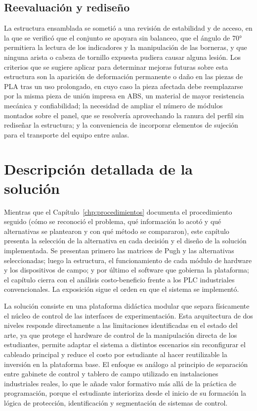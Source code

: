 \documentclass[12pt,a4paper,oneside]{report}
\begin{document}
\section{Reevaluación y rediseño}

La estructura ensamblada se sometió a una revisión de estabilidad y de acceso, en la que se verificó que el conjunto se apoyara sin balanceo, que el ángulo de 70° permitiera la lectura de los indicadores y la manipulación de las borneras, y que ninguna arista o cabeza de tornillo expuesta pudiera causar alguna lesión. Los criterios que se sugiere aplicar para determinar mejoras futuras sobre esta estructura son la aparición de deformación permanente o daño en las piezas de PLA tras un uso prolongado, en cuyo caso la pieza afectada debe reemplazarse por la misma pieza de unión impresa en ABS, un material de mayor resistencia mecánica y confiabilidad; la necesidad de ampliar el número de módulos montados sobre el panel, que se resolvería aprovechando la ranura del perfil sin rediseñar la estructura; y la conveniencia de incorporar elementos de sujeción para el transporte del equipo entre aulas.



\chapter{Descripción detallada de la solución}
\label{chp:enfoque}

Mientras que el Capítulo~\ref{chp:procedimientos} documenta el procedimiento seguido (cómo se reconoció el problema, qué información lo acotó y qué alternativas se plantearon y con qué método se compararon), este capítulo presenta la selección de la alternativa en cada decisión y el diseño de la solución implementada. Se presentan primero las matrices de Pugh y las alternativas seleccionadas; luego la estructura, el funcionamiento de cada módulo de hardware y los dispositivos de campo; y por último el software que gobierna la plataforma; el capítulo cierra con el análisis costo-beneficio frente a los PLC industriales convencionales. La exposición sigue el orden en que el sistema se implementó.

La solución consiste en una plataforma didáctica modular que separa físicamente el núcleo de control de las interfaces de experimentación. Esta arquitectura de dos niveles responde directamente a las limitaciones identificadas en el estado del arte, ya que protege el hardware de control de la manipulación directa de los estudiantes, permite adaptar el sistema a distintos escenarios sin reconfigurar el cableado principal y reduce el costo por estudiante al hacer reutilizable la inversión en la plataforma base. El enfoque es análogo al principio de separación entre gabinete de control y tablero de campo utilizado en instalaciones industriales reales, lo que le añade valor formativo más allá de la práctica de programación, porque el estudiante interioriza desde el inicio de su formación la lógica de protección, identificación y segmentación de sistemas de control.
\end{document}

